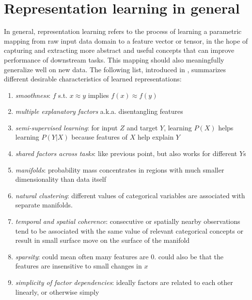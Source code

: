 \section{Representation learning in general}
\label{sec-repr-models-general}
In general, representation learning refers to the process of learning 
a parametric mapping from raw input data domain
to a feature vector or tensor, in the hope of capturing and extracting more abstract and useful concepts
that can improve performance of downstream tasks.
This mapping should also meaningfully generalize well on new data.
The following list, introduced in \cite{bengio2013representation},
summarizes different desirable characteristics of learned representations:
\begin{enumerate}
		\item \textit{smoothness}: $ f  $ s.t. $ x \approx y  $ implies
				$ f(x) \approx f (y)  $
		\item \textit{multiple explanatory factors} a.k.a. disentangling 
				features
		\item \textit{semi-supervised learning}: for input $ Z  $ and target $ Y  $,
				learning $ P (X)  $ helps learning $ P (Y|X)  $ because
				features of $ X  $ help explain $ Y  $
		\item \textit{shared factors across tasks}: like previous point,
				but also works for different $ Y  $s
		\item \textit{manifolds}: probability mass concentrates
				in regions with much smaller dimensionality than data itself
		\item \textit{natural clustering}: different values of categorical variables
				are associated with separate manifolds.
		\item \textit{temporal and spatial coherence}:
				consecutive or spatially nearby observations
				tend to be associated with the same value of relevant categorical
				concepts or result in small surface move on the surface of the manifold
		\item \textit{sparsity}: could mean often many features are 0. could also be
				that the features are insensitive to small changes in $ x  $
		\item \textit{simplicity of factor dependencies}: ideally factors are related
				to each other linearly, or otherwise simply
\end{enumerate}

